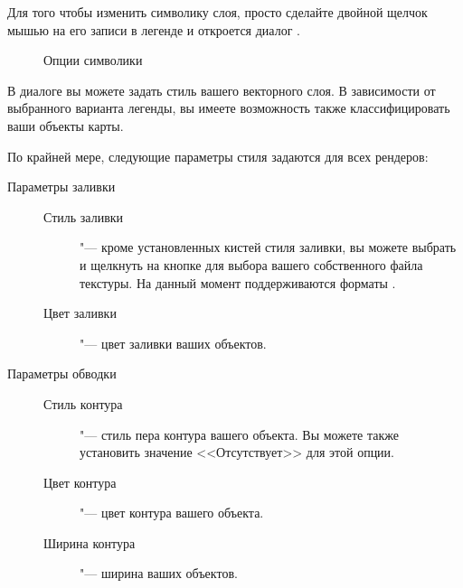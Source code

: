 Для того чтобы изменить символику слоя, просто сделайте двойной щелчок
мышью на его записи в легенде и откроется диалог .

\begin{figure}[ht]
\centering
   \hspace{1cm}
   \hspace{1cm}
   \hspace{1cm}
\caption{Опции символики \wincaption}
\end{figure}


 \label{sec:style_options} 
В диалоге вы можете задать стиль вашего векторного слоя. В зависимости от
выбранного варианта легенды, вы имеете возможность также классифицировать
ваши объекты карты.

По крайней мере, следующие параметры стиля задаются для всех рендеров:
\begin{description}
\item[Параметры заливки]
\begin{description}
 \item[Стиль заливки] "--- кроме установленных кистей стиля заливки, вы
 можете выбрать  и щелкнуть на
 кнопке \browsebutton для выбора вашего собственного файла текстуры. На
 данный момент поддерживаются форматы .
 \item[Цвет заливки] "--- цвет заливки ваших объектов.
\end{description}
\item[Параметры обводки]
\begin{description}
 \item[Стиль контура] "--- стиль пера контура вашего объекта. Вы можете
 также установить значение <<Отсутствует>> для этой опции.
 \item[Цвет контура] "--- цвет контура вашего объекта.
 \item[Ширина контура] "--- ширина ваших объектов.
\end{description}
\end{description}

